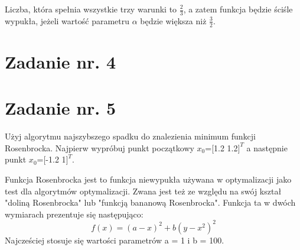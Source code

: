 \documentclass{article}
\begin{document}
Liczba, która spełnia wszystkie trzy warunki to $\frac{2}{3}$, a zatem funkcja będzie ściśle
wypukła, jeżeli wartość parametru $\alpha$ będzie większa niż $\frac{3}{2}$.

\section{Zadanie nr. 4}

\section{Zadanie nr. 5}
Użyj algorytmu najszybszego spadku do znalezienia minimum funkcji Rosenbrocka. Najpierw wypróbuj punkt początkowy $x_0$=[1.2 1.2$]^T$
a następnie punkt $x_0$=[-1.2 1$]^T$.

Funkcja Rosenbrocka jest to funkcja niewypukła używana w optymalizacji jako test dla algorytmów optymalizacji.
Zwana jest też ze względu na swój kształ "doliną Rosenbrocka" lub "funkcją bananową Rosenbrocka".
Funkcja ta w dwóch wymiarach prezentuje się następująco:
\begin{equation}
  f(x)= (a - x)^2 + b(y-x^2)^2
\end{equation}
Najcześciej stosuje się wartości parametrów a = 1 i b = 100.
\end{document}
